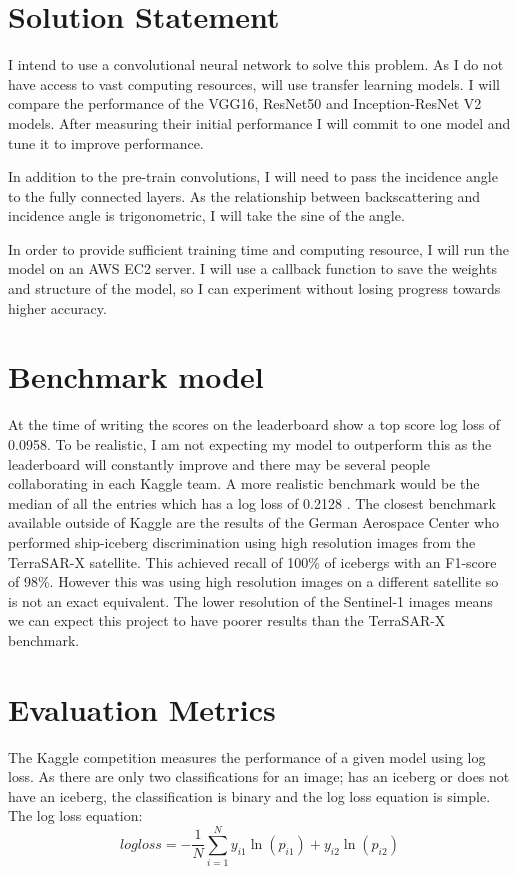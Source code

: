 \documentclass{article}
\begin{document}
\section{Solution Statement}
I intend to use a convolutional neural network to solve this problem. As I do not have access to vast computing resources, will use transfer learning models. I will compare the performance of the VGG16, ResNet50 and Inception-ResNet V2 models. After measuring their initial performance I will commit to one model and tune it to improve performance. 

In addition to the pre-train convolutions, I will need to pass the incidence angle to the fully connected layers. As the relationship between backscattering and incidence angle is trigonometric, I will take the sine of the angle. 

In order to provide sufficient training time and computing resource, I will run the model on an AWS EC2 server. I will use a callback function to save the weights and structure of the model, so I can experiment without losing progress towards higher accuracy.

\section{Benchmark model}
At the time of writing the scores on the leaderboard show a top score log loss of 0.0958. To be realistic, I am not expecting my model to outperform this as the leaderboard will constantly improve and there may be several people collaborating in each Kaggle team. A more realistic benchmark would be the median of all the entries which has a log loss of 0.2128 \cite{kaggle}.
The closest benchmark available outside of Kaggle are the results of the German Aerospace Center \cite{bentes} who performed ship-iceberg discrimination using high resolution images from the TerraSAR-X satellite. This achieved recall of 100\% of icebergs with an F1-score of 98\%. However this was using high resolution images on a different satellite so is not an exact equivalent. The lower resolution of the Sentinel-1 images means we can expect this project to have poorer results than the TerraSAR-X benchmark. 

\section{Evaluation Metrics}
The Kaggle competition measures the performance of a given model using log loss. As there are only two classifications for an image; has an iceberg or does not have an iceberg, the classification is binary and the log loss equation is simple. The log loss equation: \cite{logloss}
\[ log loss = - \frac{1}{N} \sum_{i=1}^{N} y_{i1}\ln(p_{i1}) + y_{i2}\ln(p_{i2}) \]
\end{document}
